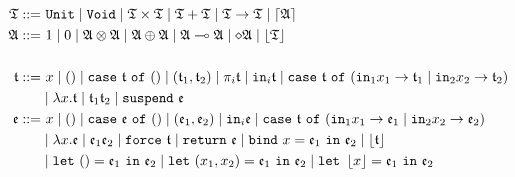 \begin{align*}
    \T ::=&~ \mathtt{Unit} \mid \mathtt{Void} \mid \T \times \T \mid \T + \T \mid \T \rightarrow \T \mid \ceil{\A} \\
    \A ::=&~ 1 \mid 0 \mid \A \otimes \A \mid \A \oplus \A \mid \A \multimap \A \mid \diamond\A \mid \floor{\T} \\
    \\
    \t ::=&~ x \mid () \mid \mathtt{case}~\t~\mathtt{of}~() \mid (\t_1, \t_2) \mid \pi_i \t \mid \mathtt{in}_i \t \mid \mathtt{case}~\t~\mathtt{of}~(\mathtt{in}_1 x_1 \rightarrow \t_1 \mid \mathtt{in}_2 x_2 \rightarrow \t_2) \\
    & \mid \lambda x. \t \mid \t_1 \t_2 \mid \mathtt{suspend}~\e \\
    \e ::=&~ x \mid () \mid \mathtt{case}~\e~\mathtt{of}~() \mid (\e_1, \e_2) \mid \mathtt{in}_i \e \mid \mathtt{case}~\t~\mathtt{of}~(\mathtt{in}_1 x_1 \rightarrow \e_1 \mid \mathtt{in}_2 x_2 \rightarrow \e_2) \\
    & \mid \lambda x. \e \mid \e_1 \e_2 \mid \mathtt{force}~\t \mid \mathtt{return}~\e \mid \mathtt{bind}~x = \e_1~\mathtt{in}~\e_2 \mid \floor{\t} \\
    &\mid \mathtt{let}~() = \e_1~\mathtt{in}~\e_2 \mid \mathtt{let}~(x_1, x_2) = \e_1~\mathtt{in}~\e_2 \mid \mathtt{let}~\floor{x} = \e_1~\mathtt{in}~\e_2
\end{align*}

